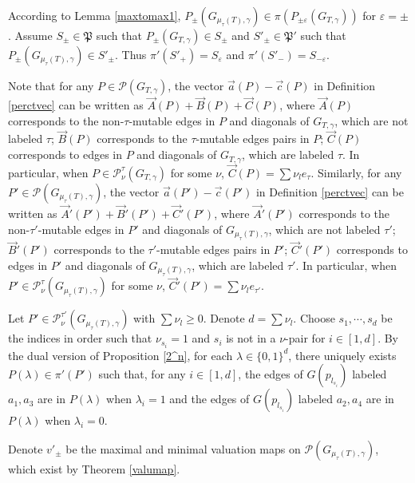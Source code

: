 \documentclass[10pt]{amsart}
\theoremstyle{theorems}
\begin{document}
\medskip

According to Lemma \ref{maxtomax1}, $P_{\pm}(G_{\mu_{\tau}(T),\gamma})\in \pi(P_{\pm\varepsilon}(G_{T,\gamma}))$ for $\varepsilon =\pm$. Assume $S_{\pm}\in \mathfrak P$ such that $P_{\pm}(G_{T,\gamma})\in S_{\pm}$ and $S'_{\pm}\in \mathfrak P'$ such that $P_{\pm}(G_{\mu_{\tau}(T),\gamma})\in S'_{\pm}$. Thus $\pi'(S'_{+})=S_{\varepsilon}$ and $\pi'(S'_{-})=S_{-\varepsilon}$.

\medskip

Note that for any $P\in \mathcal P(G_{T,\gamma})$, the vector $\vec{a}(P)-\vec{c}(P)$ in Definition \ref{perctvec} can be written as $\vec{A}(P)+\vec{B}(P)+\vec{C}(P)$, where $\vec{A}(P)$ corresponds to the non-$\tau$-mutable edges in $P$ and diagonals of $G_{T,\gamma}$, which are not labeled $\tau$; $\vec{B}(P)$ corresponds to the $\tau$-mutable edges pairs in $P$; $\vec{C}(P)$ corresponds to edges in $P$ and diagonals of $G_{T,\gamma}$, which are labeled $\tau$. In particular, when $P\in \mathcal P^{\tau}_{\nu}(G_{T,\gamma})$ for some $\nu$, $\vec{C}(P)=\sum\nu_l e_{\tau}$. Similarly, for any $P'\in \mathcal P(G_{\mu_{\tau}(T),\gamma})$, the vector $\vec{a}(P')-\vec{c}(P')$ in Definition \ref{perctvec} can be written as $\vec{A}'(P')+\vec{B}'(P')+\vec{C}'(P')$, where $\vec{A}'(P')$ corresponds to the non-$\tau'$-mutable edges in $P'$ and diagonals of $G_{\mu_{\tau}(T),\gamma}$, which are not labeled $\tau'$; $\vec{B}'(P')$ corresponds to the $\tau'$-mutable edges pairs in $P'$; $\vec{C}'(P')$ corresponds to edges in $P'$ and diagonals of $G_{\mu_{\tau}(T),\gamma}$, which are labeled $\tau'$. In particular, when $P'\in \mathcal P^{\tau}_{\nu}(G_{\mu_{\tau}(T),\gamma})$ for some $\nu$, $\vec{C}'(P')=\sum\nu_l e_{\tau'}$.

\medskip

Let $P'\in \mathcal P^{\tau'}_{\nu}(G_{\mu_{\tau}(T),\gamma})$ with $\sum \nu_l\geq 0$. Denote $d=\sum\nu_l$. Choose $s_1,\cdots,s_d$ be the indices in order such that $\nu_{s_i}=1$ and $s_i$ is not in a $\nu$-pair for $i\in [1,d]$. By the dual version of Proposition \ref{2^n}, for each $\lambda\in \{0,1\}^d$, there uniquely exists $P(\lambda)\in \pi'(P')$ such that, for any $i\in [1,d]$, the edges of $G(p_{l_{s_i}})$ labeled $a_1,a_3$ are in $P(\lambda)$ when $\lambda_i=1$ and the edges of $G(p_{l_{s_i}})$ labeled $a_2,a_4$ are in $P(\lambda)$ when $\lambda_i=0$.

\medskip

Denote $v'_{\pm}$ be the maximal and minimal valuation maps on $\mathcal P(G_{\mu_{\tau}(T),\gamma})$, which exist by Theorem \ref{valumap}.
\end{document}
